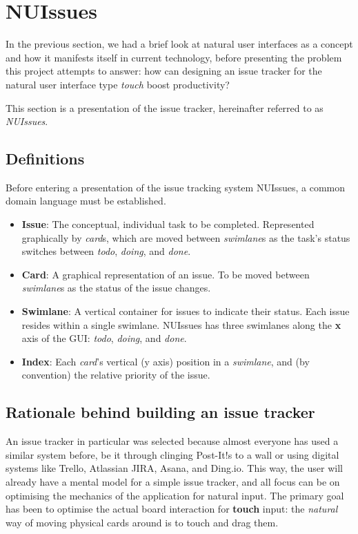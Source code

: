 \section{NUIssues}

In the previous section, we had a brief look at natural user interfaces as a concept and how it manifests itself in current technology, before presenting the problem this project attempts to answer: how can designing an issue tracker for the natural user interface type \textit{touch} boost productivity?

This section is a presentation of the issue tracker, hereinafter referred to as \textit{NUIssues}.

\subsection{Definitions}

Before entering a presentation of the issue tracking system NUIssues, a common domain language must be established.

\begin{itemize}
  \item \textbf{Issue}: The conceptual, individual task to be completed. Represented graphically by \textit{card}s, which are moved between \textit{swimlane}s as the task's status switches between \textit{todo}, \textit{doing}, and \textit{done}.
  \item \textbf{Card}: A graphical representation of an issue. To be moved between \textit{swimlane}s as the status of the issue changes.
  \item \textbf{Swimlane}: A vertical container for issues to indicate their status. Each issue resides within a single swimlane. NUIssues has three swimlanes along the \textbf{x} axis of the GUI: \textit{todo}, \textit{doing}, and \textit{done}.
  \item \textbf{Index}: Each \textit{card}'s vertical (y axis) position in a \textit{swimlane}, and (by convention) the relative priority of the issue.
\end{itemize}

\subsection{Rationale behind building an issue tracker}

An issue tracker in particular was selected because almost everyone has used a similar system before, be it through clinging Post-It!s to a wall or using digital systems like Trello, Atlassian JIRA, Asana, and Ding.io. This way, the user will already have a mental model for a simple issue tracker, and all focus can be on optimising the mechanics of the application for natural input. The primary goal has been to optimise the actual board interaction for \textbf{touch} input: the \textit{natural} way of moving physical cards around is to touch and drag them.

